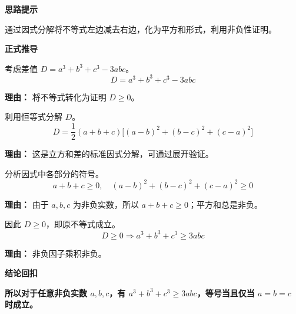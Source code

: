\begin{proofbox}
\textbf{\textcolor{CProof}{思路提示}}

通过因式分解将不等式左边减去右边，化为平方和形式，利用非负性证明。

\medskip
\textbf{\textcolor{CProof}{正式推导}}
\begin{description}[style=nextline, leftmargin=2.8em, labelsep=0.5em, itemsep=0.55em]
    \item[\textbf{步骤一（构造差值）：}] 考虑差值 $D = a^3 + b^3 + c^3 - 3abc$。
    \[
    D = a^3 + b^3 + c^3 - 3abc
    \]
    \par\textbf{理由：}
    将不等式转化为证明 $D \geq 0$。

    \item[\textbf{步骤二（因式分解）：}] 利用恒等式分解 $D$。
    \[
    D = \frac{1}{2}(a+b+c)\bigl[(a-b)^2+(b-c)^2+(c-a)^2\bigr]
    \]
    \par\textbf{理由：}
    这是立方和差的标准因式分解，可通过展开验证。

    \item[\textbf{步骤三（分析符号）：}] 分析因式中各部分的符号。
    \[
    a+b+c \geq 0, \quad (a-b)^2+(b-c)^2+(c-a)^2 \geq 0
    \]
    \par\textbf{理由：}
    由于 $a, b, c$ 为非负实数，所以 $a+b+c \geq 0$；平方和总是非负。

    \item[\textbf{步骤四（得出结论）：}] 因此 $D \geq 0$，即原不等式成立。
    \[
    D \geq 0 \Rightarrow a^3 + b^3 + c^3 \geq 3abc
    \]
    \par\textbf{理由：}
    非负因子乘积非负。
\end{description}

\medskip
\textbf{\textcolor{CProof}{结论回扣}}

\textbf{所以对于任意非负实数 $a, b, c$，有 $a^3 + b^3 + c^3 \geq 3abc$，等号当且仅当 $a=b=c$ 时成立。}
\end{proofbox}
